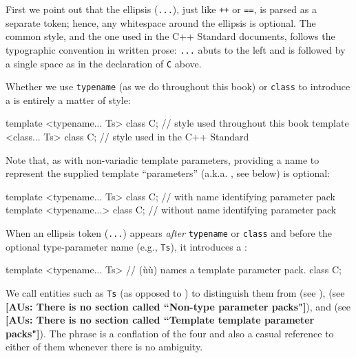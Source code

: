 First we point out that the ellipsis (\lstinline!...!), just like
\lstinline!++! or \lstinline!==!, is parsed as a separate token; hence, any
whitespace around the ellipsis is optional. The common style, and the
one used in the C++ Standard documents, follows the typographic
convention in written prose: \lstinline!...! abuts to the left and is
followed by a single space as in the declaration of \lstinline!C! above.

Whether we use \lstinline!typename! (as we do throughout this book) or
\lstinline!class! to introduce a  is
entirely a matter of style:

\begin{emcppslisting}
template <typename... Ts> class C;  // style used throughout this book
template <class... Ts> class C;     // style used in the C++ Standard
\end{emcppslisting}
    

\noindent Note that, as with non-variadic template parameters, providing a name to
represent the supplied template ``parameters'' (a.k.a. , see below) is optional:

\begin{emcppslisting}
template <typename... Ts> class C;  // with    name identifying parameter pack
template <typename...> class C;     // without name identifying parameter pack
\end{emcppslisting}
    

\noindent When an ellipsis token (\lstinline!...!) appears \emph{after}
\lstinline!typename! or \lstinline!class! and before the optional
type-parameter name (e.g., \lstinline!Ts!), it introduces a
:

\begin{emcppslisting}
template <typename... Ts>  // (ù{}ù) names a template parameter pack.
class C;
\end{emcppslisting}
    

\noindent We call entities such as \lstinline!Ts! 
(as opposed to ) to distinguish them from
 (see ),  (see
\intrarefsimple{} \textbf{[AUs: There is no section called ``Non-type parameter packs"]}), and  (see \intrarefsimple{} \textbf{[AUs: There is no section called ``Template template
parameter packs"]}). The phrase  is a conflation
of the four and also a casual reference to either of them whenever there
is no ambiguity.

